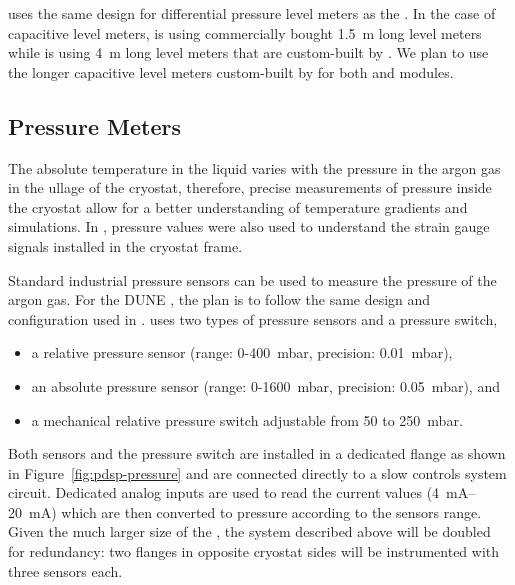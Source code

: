   uses the same design for differential pressure level meters %
as the . In the case of capacitive level meters,  is using commercially bought \SI{1.5}{m} long level meters while  is using  \SI{4}{m} long level meters that are custom-built by . %
We plan to use the longer capacitive level meters custom-built by   for both  and  modules.

\subsection{Pressure Meters}
\label{sec:fdgen-slow-cryo-press-meter}

The absolute temperature in the liquid varies with the pressure in the argon gas in the ullage of the cryostat, therefore, precise measurements of pressure inside the cryostat allow for a better understanding of temperature gradients and  simulations. In , pressure values were also used to understand the strain gauge signals installed in the cryostat frame.

Standard industrial pressure sensors can be used to measure the pressure of the argon gas. For the DUNE , the plan is to follow the same design and configuration used in .  uses two types of pressure sensors and a pressure switch, %
\begin{itemize}
    \item a relative pressure sensor (range: 0-400~mbar, precision: 0.01~mbar),
    \item an absolute pressure sensor (range: 0-1600~mbar, precision: 0.05~mbar), and
    \item a mechanical relative pressure switch adjustable from 50 to 250~mbar. 
\end{itemize}

Both sensors and the pressure switch are installed in a dedicated flange as shown in Figure~\ref{fig:pdsp-pressure} and are connected directly to a slow controls system  circuit. Dedicated analog inputs are used to read the current values (\SIrange{4}{20}{mA}) which are then converted to pressure according to the sensors range. Given the much larger size of the   , the system described above will be doubled for redundancy: two flanges in opposite cryostat sides will be instrumented with three sensors each. 

